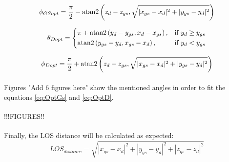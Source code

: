 \begin{equation*}
  \phi_{GSopt}= 
  \dfrac{\pi}{2} - {\rm atan2}\left(z_{d}-z_{gs}, \sqrt{|x_{gs}-x_{d}|^{2}+|y_{gs}-y_{d}|^{2}}\right)
  \label{eq:OptGS}
\end{equation*}

\begin{equation}
  \theta_{Dopt}=
  \begin{dcases}
    \pi + {\rm atan2}\left(y_{d}-y_{gs}, x_{d}-x_{gs}\right), & \text{if } y_{d} \geq y_{gs}\\
    {\rm atan2}\left(y_{gs}-y_{d}, x_{gs}-x_{d}\right), & \text{if } y_{d} < y_{gs}
  \end{dcases}
\end{equation}

\begin{equation*}
  \phi_{Dopt}= 
  \dfrac{\pi}{2} + {\rm atan2}\left(z_{d}-z_{gs}, \sqrt{|x_{gs}-x_{d}|^{2}+|y_{gs}-y_{d}|^{2}}\right)
  \label{eq:OptD}
\end{equation*}

\paragraph{} Figures "Add 6 figures here" show the mentioned angles in order to fit the equations \ref{eq:OptGs} and \ref{eq:OptD}.

\paragraph{} !!!FIGURES!!

\paragraph{} Finally, the LOS distance will be calculated as expected:
\begin{equation*}
  LOS_{distance}= 
  \sqrt{|x_{gs}-x_{d}|^{2}+|y_{gs}-y_{d}|^{2}+|z_{gs}-z_{d}|^{2}}
  \label{eq:OptD}
\end{equation*}

